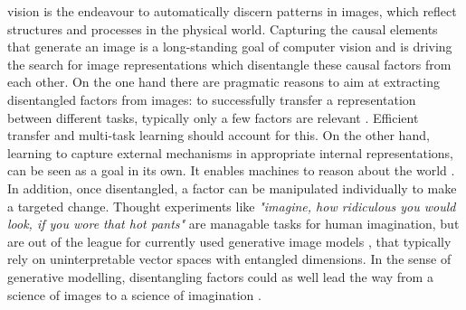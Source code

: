  vision is the endeavour to automatically discern patterns in images, which reflect structures and processes in the physical world.
Capturing the causal elements that generate an image is a long-standing goal of computer vision and is driving the search for image representations which disentangle these causal factors from each other.
On the one hand there are pragmatic reasons to aim at extracting disentangled factors from images: to successfully transfer a representation between different tasks, typically only a few factors are relevant \cite{Bengio:2013bu}.
Efficient transfer and multi-task learning should account for this.
On the other hand, learning to capture external mechanisms in appropriate internal representations, can be seen as a goal in its own.
It enables machines to reason about the world \cite{Pearl:2018im}.
In addition, once disentangled, a factor can be manipulated individually to make a targeted change.
Thought experiments like \textit{"imagine, how ridiculous you would look, if you wore that hot pants"} are managable tasks for human imagination, but are out of the league for currently used generative image models \cite{Goodfellow:2014td, Kingma:2013tz}, that typically rely on uninterpretable vector spaces with entangled dimensions.
In the sense of generative modelling, disentangling factors could as well lead the way from a science of images to a science of imagination \cite{Mahadevan:2018tz}.
